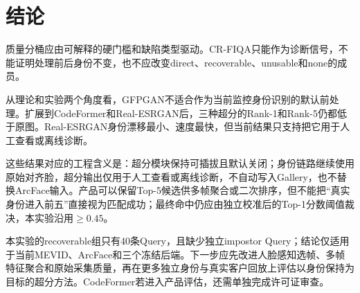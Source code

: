 \documentclass[UTF8,a4paper,10pt]{ctexart}
\begin{document}
\FloatBarrier
\section{结论}

质量分桶应由可解释的硬门槛和缺陷类型驱动。CR-FIQA只能作为诊断信号，不能证明处理前后身份不变，也不应改变direct、recoverable、unusable和none的成员。

从理论和实验两个角度看，GFPGAN不适合作为当前监控身份识别的默认前处理。扩展到CodeFormer和Real-ESRGAN后，三种超分的Rank-1和Rank-5仍都低于原图。Real-ESRGAN身份漂移最小、速度最快，但当前结果只支持把它用于人工查看或离线诊断。

这些结果对应的工程含义是：超分模块保持可插拔且默认关闭；身份链路继续使用原始对齐脸，超分输出仅用于人工查看或离线诊断，不自动写入Gallery，也不替换ArcFace输入。产品可以保留Top-5候选供多帧聚合或二次排序，但不能把“真实身份进入前五”直接视为匹配成功；最终命中仍应由独立校准后的Top-1分数阈值裁决，本实验沿用$\geq0.45$。

本实验的recoverable组只有40条Query，且缺少独立impostor Query；结论仅适用于当前MEVID、ArcFace和三个冻结后端。下一步应先改进人脸感知选帧、多帧特征聚合和原始采集质量，再在更多独立身份与真实客户回放上评估以身份保持为目标的超分方法。CodeFormer若进入产品评估，还需单独完成许可证审查。
\end{document}
